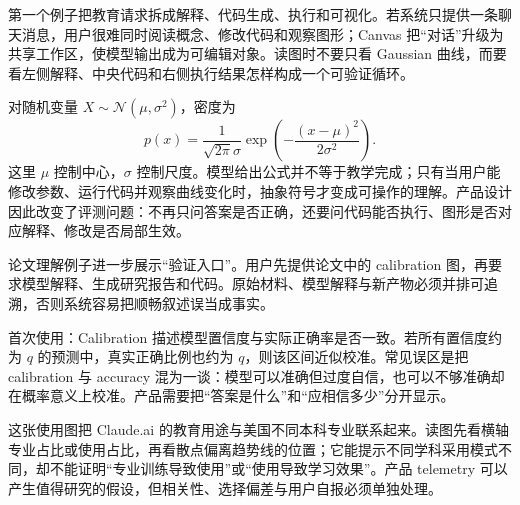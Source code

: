 第一个例子把教育请求拆成解释、代码生成、执行和可视化。若系统只提供一条聊天消息，用户很难同时阅读概念、修改代码和观察图形；Canvas 把“对话”升级为共享工作区，使模型输出成为可编辑对象。读图时不要只看 Gaussian 曲线，而要看左侧解释、中央代码和右侧执行结果怎样构成一个可验证循环。


对随机变量 $X\sim\mathcal{N}(\mu,\sigma^2)$，密度为
\[
p(x)=\frac{1}{\sqrt{2\pi}\sigma}
\exp\!\left(-\frac{(x-\mu)^2}{2\sigma^2}\right).
\]
这里 $\mu$ 控制中心，$\sigma$ 控制尺度。模型给出公式并不等于教学完成；只有当用户能修改参数、运行代码并观察曲线变化时，抽象符号才变成可操作的理解。产品设计因此改变了评测问题：不再只问答案是否正确，还要问代码能否执行、图形是否对应解释、修改是否局部生效。


论文理解例子进一步展示“验证入口”。用户先提供论文中的 calibration 图，再要求模型解释、生成研究报告和代码。原始材料、模型解释与新产物必须并排可追溯，否则系统容易把顺畅叙述误当成事实。



\begin{knowledgebox}{首次使用：Calibration}
描述模型置信度与实际正确率是否一致。若所有置信度约为 $q$ 的预测中，真实正确比例也约为 $q$，则该区间近似校准。常见误区是把 calibration 与 accuracy 混为一谈：模型可以准确但过度自信，也可以不够准确却在概率意义上校准。产品需要把“答案是什么”和“应相信多少”分开显示。
\end{knowledgebox}


这张使用图把 Claude.ai 的教育用途与美国不同本科专业联系起来。读图先看横轴专业占比或使用占比，再看散点偏离趋势线的位置；它能提示不同学科采用模式不同，却不能证明“专业训练导致使用”或“使用导致学习效果”。产品 telemetry 可以产生值得研究的假设，但相关性、选择偏差与用户自报必须单独处理。

